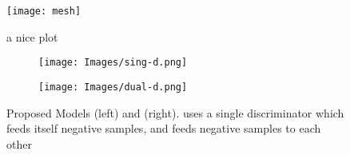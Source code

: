 
\begin{figure}[h]
    \centering
    \texttt{[image: mesh]}
    \caption{a nice plot}
    \label{fig:mesh1}
\end{figure}



\usepackage{graphicx}
\usepackage{subcaption}

\begin{figure*}[h]
\begin{subfigure}{.45\textwidth}
  \centering
  \texttt{[image: Images/sing-d.png]}
\end{subfigure}\hfill
\begin{subfigure}{.45\textwidth}
  \centering
  \texttt{[image: Images/dual-d.png]}
\end{subfigure}
\caption{Proposed Models \singd{} (left) and \duald{} (right). \textit{\singd{}} uses a single discriminator which feeds itself negative samples, and \textit{\duald{}} feeds negative samples to each other}
\label{fig:models}
\end{figure*}
